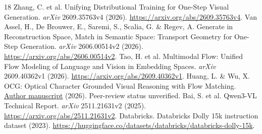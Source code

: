 \documentclass[10pt,a4paper]{article}
\begin{document}
\begin{thebibliography}{18}
 Zhang, C. et al. Unifying Distributional Training for One-Step Visual Generation. \emph{arXiv} 2609.35763v4 (2026). \url{https://arxiv.org/abs/2609.35763v4}.
 Van Assel, H., De Brouwer, E., Saremi, S., Scalia, G. \& Regev, A. Generate in Reconstruction Space, Match in Semantic Space: Transport Geometry for One-Step Generation. \emph{arXiv} 2606.00514v2 (2026). \url{https://arxiv.org/abs/2606.00514v2}.
 Tao, H. et al. Multimodal Flow: Unified Flow Modeling of Language and Vision in Embedding Spaces. \emph{arXiv} 2609.40362v1 (2026). \url{https://arxiv.org/abs/2609.40362v1}.
 Huang, L. \& Wu, X. OCG: Optical Character Grounded Visual Reasoning with Flow Matching. \href{https://www.alphaxiv.org/abs/2608.ocg-optical-character-grounded-reasoning}{Author manuscript} (2026). Peer-review status unverified.
 Bai, S. et al. Qwen3-VL Technical Report. \emph{arXiv} 2511.21631v2 (2025). \url{https://arxiv.org/abs/2511.21631v2}.
 Databricks. Databricks Dolly 15k instruction dataset (2023). \url{https://huggingface.co/datasets/databricks/databricks-dolly-15k}.
\end{thebibliography}
\end{document}
